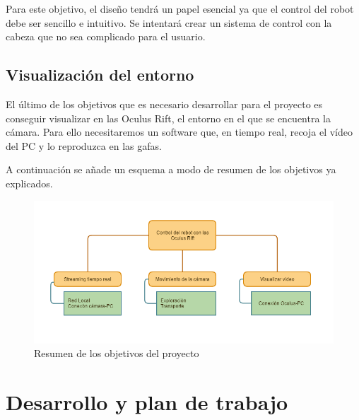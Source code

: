 \documentclass[twoside, 11pt]{epstfg}
\begin{document}
Para este objetivo, el diseño tendrá un papel esencial ya que el control del robot debe ser sencillo e intuitivo. Se intentará crear un sistema de control con la cabeza que no sea complicado para el usuario.

\subsection{Visualización del entorno}
El último de los objetivos que es necesario desarrollar para el proyecto es conseguir visualizar en las Oculus Rift, el entorno en el que se encuentra la cámara.
Para ello necesitaremos un software que, en tiempo real, recoja el vídeo del PC y lo reproduzca en las gafas. 

A continuación se añade un esquema a modo de resumen de los objetivos ya explicados.

\begin{figure}[h!]
	\centerline{
		\mbox{\includegraphics[width=7.00in]{images/objetivos.png}}
	}
	\caption{Resumen de los objetivos del proyecto}
	\label{objetivos}
\end{figure}


\newpage
\section{Desarrollo y plan de trabajo}
\end{document}
